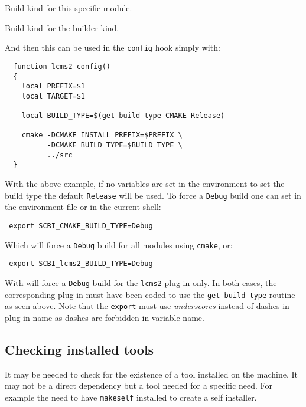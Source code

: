 \documentclass[a4paper,12pt,twoside]{article}
\newcommand{\code}[1]{\texttt{#1}}
\renewcommand{\emph}[1]{\textit{#1}}
\begin{document}
\begin{description}[style=nextline]
	\item [SCBI\_<module>\_BUILD\_TYPE] Build kind for this specific module.
	\item [SCBI\_<CONFIG>\_BUILD\_TYPE] Build kind for the builder kind.
\end{description}

And then this can be used in the \code{config} hook simply with:

\begin{lstlisting}
  function lcms2-config()
  {
    local PREFIX=$1
    local TARGET=$1

    local BUILD_TYPE=$(get-build-type CMAKE Release)

    cmake -DCMAKE_INSTALL_PREFIX=$PREFIX \
          -DCMAKE_BUILD_TYPE=$BUILD_TYPE \
          ../src
  }
\end{lstlisting}

With the above example, if no variables are set in the environment to set the build type the default \code{Release} will be used. To force a \code{Debug} build one can set in the environment file or in the current shell:

\begin{lstlisting}
 export SCBI_CMAKE_BUILD_TYPE=Debug
\end{lstlisting}

Which will force a \code{Debug} build for all modules using \code{cmake}, or:

\begin{lstlisting}
 export SCBI_lcms2_BUILD_TYPE=Debug
\end{lstlisting}

With will force a \code{Debug} build for the \code{lcms2} plug-in only. In both cases, the corresponding plug-in must have been coded to use the \code{get-build-type} routine as seen above. Note that the \code{export} must use \emph{underscores} instead of dashes in plug-in name as dashes are forbidden in variable name.

\subsection{Checking installed tools}

It may be needed to check for the existence of a tool installed on the machine. It may not be a direct dependency but a tool needed for a specific need. For example the need to have \code{makeself} installed to create a self installer.
\end{document}
